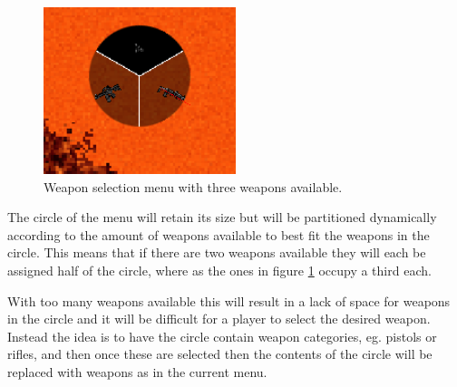 \begin{figure}[H]
\centering
\includegraphics[width=0.5\textwidth]{figures/controlscheme/weapon_selection}
\caption{Weapon selection menu with three weapons available.}
\label{fig:weaponselection}
\end{figure}


The circle of the menu will retain its size but will be partitioned dynamically according to the amount of weapons available to best fit the weapons in the circle. This means that if there are two weapons available they will each be assigned half of the circle, where as the ones in figure \ref{fig:weaponselection} occupy a third each.

With too many weapons available this will result in a lack of space for weapons in the circle and it will be difficult for a player to select the desired weapon. Instead the idea is to have the circle contain weapon categories, eg. pistols or rifles, and then once these are selected then the contents of the circle will be replaced with weapons as in the current menu. 